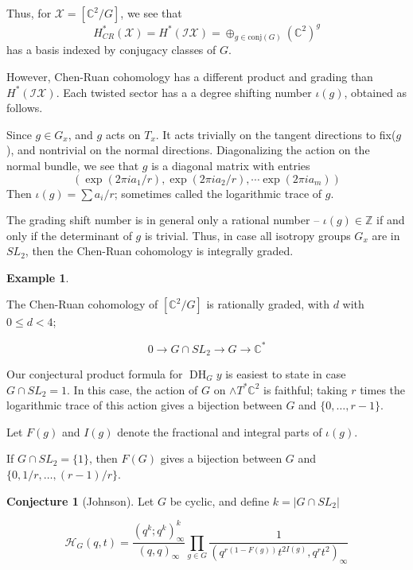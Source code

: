 \documentclass{amsart}[12pt]
\theoremstyle{definition}
\newtheorem{example}[dummy]{Example}
\newtheorem{conjecture}[dummy]{Conjecture}
\newcommand{\Z}{\mathbb{Z}}
\newcommand{\C}{\mathbb{C}}
\DeclareMathOperator{\DC}{DH}
\begin{document}
Thus, for $\mathcal{X}=[\C^2/G]$, we see that 
$$H_{CR}^*(\mathcal{X}) =H^*(\mathcal{IX})=\oplus_{g\in\textrm{conj}(G)} (\C^2)^g$$
has a basis indexed by conjugacy classes of $G$.

However, Chen-Ruan cohomology has a different product and grading than $H^*(\mathcal{IX})$.  Each twisted sector has a a degree shifting number $\iota(g)$, obtained as follows.

Since $g\in G_x$, and $g$ acts on $T_x$.  It acts trivially on the tangent directions to fix($g$), and nontrivial on the normal directions.  Diagonalizing the action on the normal bundle, we see that $g$ is a diagonal matrix with entries 
$$(\exp(2\pi i a_1/r), \exp(2\pi i a_2/r), \cdots \exp(2\pi i a_m))$$
Then $\iota(g)=\sum a_i/r$; sometimes called the logarithmic trace of $g$.

The grading shift number is in general only a rational number -- $\iota(g)\in \Z$ if and only if the determinant of $g$ is trivial.  Thus, in case all isotropy groups $G_x$ are in $SL_2$, then the Chen-Ruan cohomology is integrally graded.

\begin{example}

\end{example}


The Chen-Ruan cohomology of $[\C^2/G]$ is rationally graded, with $d$ with $0\leq d < 4$;


$$0\to G\cap SL_2\to G \to \C^*$$








Our conjectural product formula for $\DC_Gy$ is easiest to state in case $G\cap SL_2=1$.  In this case, the action of $G$ on $\wedge T^*\C^2$ is faithful; taking $r$ times the logarithmic trace of this action gives a bijection between $G$ and $\{0,\dots, r-1\}$.


Let $F(g)$ and $I(g)$ denote the fractional and integral parts of $\iota(g)$. 

If $G\cap SL_2=\{1\}$, then $F(G)$ gives a bijection between $G$ and $\{0, 1/r,\dots, (r-1)/r\}$.
\begin{conjecture}[Johnson]
Let $G$ be cyclic, and define $k=|G\cap SL_2|$

$$\mathcal{H}_G(q,t)= \frac{(q^k;q^k)^k_\infty}{(q,q)_\infty} \prod_{g\in G}\frac{1}{(q^{r(1-F(g))} t^{2I(g)},q^rt^2)_\infty}$$

\end{conjecture}
\end{document}
